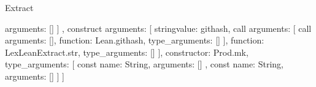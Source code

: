 \begin{lexlean}{Extract}
\begin{toolingmodule}
{{{{{{{{{{{{{{{{{{{{{{                                                                        arguments: []
                                                                      }
                                                                    ]
                                                                  },
                                                                  construct{
                                                                    arguments: [
                                                                      string{value: githash},
                                                                      call{
                                                                        arguments: [
                                                                          call{
                                                                            arguments: [],
                                                                            function: Lean.githash,
                                                                            type_arguments: []
                                                                          }
                                                                        ],
                                                                        function: LexLeanExtract.str,
                                                                        type_arguments: []
                                                                      }
                                                                    ],
                                                                    constructor: Prod.mk,
                                                                    type_arguments: [
                                                                      const{
                                                                        name: String,
                                                                        arguments: []
                                                                      },
                                                                      const{
                                                                        name: String,
                                                                        arguments: []
                                                                      }
                                                                    ]
                                                                  }
                                                                ]
                                                              }
}}}}}}}}}}}}}}}}}}}
\end{toolingmodule}
\end{lexlean}
